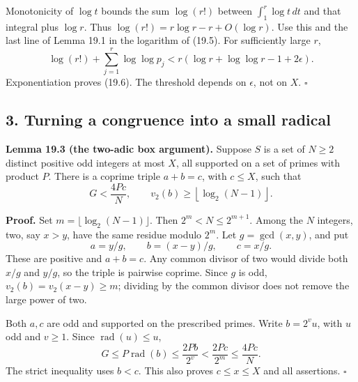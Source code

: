 \documentclass[
  11pt,
  a4paper,
]{article}
\begin{document}
Monotonicity of \(\log t\) bounds the sum \(\log(r!)\) between
\(\int_1^r\log t\,dt\) and that integral plus \(\log r\). Thus
\(\log(r!)=r\log r-r+O(\log r)\). Use this and the last line of Lemma
19.1 in the logarithm of (19.5). For sufficiently large \(r\), \[
 \log(r!)+\sum_{j=1}^r\log\log p_j
 <r(\log r+\log\log r-1+2\epsilon).
\] Exponentiation proves (19.6). The threshold depends on \(\epsilon\),
not on \(X\). \(\square\)

\subsection{3. Turning a congruence into a small
radical}\label{turning-a-congruence-into-a-small-radical}

\textbf{Lemma 19.3 (the two-adic box argument).} Suppose \(S\) is a set
of \(N\ge2\) distinct positive odd integers at most \(X\), all supported
on a set of primes with product \(P\). There is a coprime triple
\(a+b=c\), with \(c\le X\), such that \[
 G<\frac{4Pc}{N},\qquad
 v_2(b)\ge\left\lfloor\log_2(N-1)\right\rfloor.
 \tag{19.8}
\]

\textbf{Proof.} Set \(m=\lfloor\log_2(N-1)\rfloor\). Then
\(2^m<N\le2^{m+1}\). Among the \(N\) integers, two, say \(x>y\), have
the same residue modulo \(2^m\). Let \(g=\gcd(x,y)\), and put \[
 a=y/g,\qquad b=(x-y)/g,\qquad c=x/g.
 \tag{19.9}
\] These are positive and \(a+b=c\). Any common divisor of two would
divide both \(x/g\) and \(y/g\), so the triple is pairwise coprime.
Since \(g\) is odd, \(v_2(b)=v_2(x-y)\ge m\); dividing by the common
divisor does not remove the large power of two.

Both \(a,c\) are odd and supported on the prescribed primes. Write
\(b=2^vu\), with \(u\) odd and \(v\ge1\). Since
\(\operatorname{rad}(u)\le u\), \[
 G\le P\operatorname{rad}(b)
   \le\frac{2Pb}{2^v}<\frac{2Pc}{2^m}
   \le\frac{4Pc}{N}.
 \tag{19.10}
\] The strict inequality uses \(b<c\). This also proves \(c\le x\le X\)
and all assertions. \(\square\)
\end{document}
